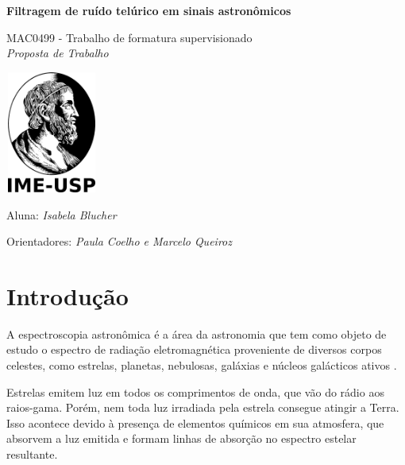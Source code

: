 \documentclass[11pt,twoside,a4paper]{article}
\begin{document}
\begin{center}
  \vspace*{3cm}
  
  \Huge
  \textbf{Filtragem de ruído telúrico em sinais astronômicos}

  \vspace{2.5cm}
  \LARGE
  MAC0499 - Trabalho de formatura supervisionado\\
  \vspace{0.3cm}
  \LARGE
  \textit{Proposta de Trabalho}

  
  \vspace{4.3cm}
  \includegraphics[height=4cm,width=3cm]{ime.png}
  \vspace{2cm}
  
  Aluna: \textit{Isabela Blucher}
  
  
  Orientadores: \textit{Paula Coelho e Marcelo Queiroz}
  
  \vspace{0.8cm}
  
  \Large
  
\end{center}


\newpage
\tableofcontents
\newpage
\section{Introdução}
\doublespacing

A espectroscopia astronômica é a área da astronomia que tem como objeto de estudo o espectro de radiação eletromagnética proveniente de diversos corpos celestes, como estrelas, planetas, nebulosas, galáxias e núcleos galácticos ativos \cite{wiki:astro_spectroscopy}. 

Estrelas emitem luz em todos os comprimentos de onda, que vão do rádio aos raios-gama. Porém, nem toda luz irradiada pela estrela consegue atingir a Terra. Isso acontece devido à presença de elementos químicos em sua atmosfera, que absorvem a luz emitida e formam linhas de absorção no espectro estelar resultante.
\end{document}
